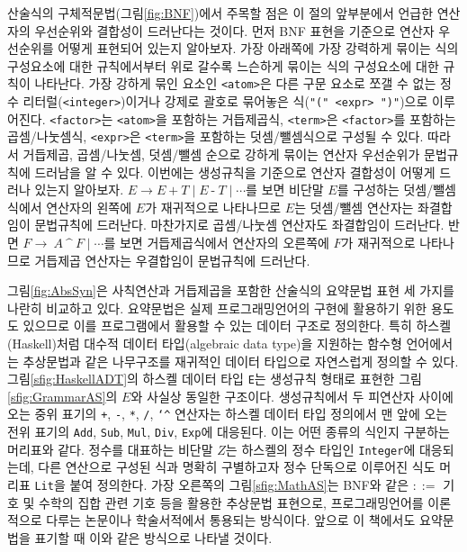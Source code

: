\documentclass[b5paper,chapter,figtabcapt]{oblivoir}
\begin{document}
산술식의 구체적문법(그림\;\ref{fig:BNF})에서 주목할 점은 이 절의
앞부분에서 언급한 연산자의 우선순위와 결합성이 드러난다는 것이다.
먼저 BNF 표현을 기준으로 연산자 우선순위를 어떻게 표현되어 있는지 알아보자.
가장 아래쪽에 가장 강력하게 묶이는 식의 구성요소에 대한 규칙에서부터
위로 갈수록 느슨하게 묶이는 식의 구성요소에 대한 규칙이 나타난다.
가장 강하게 묶인 요소인 \texttt{<atom>}은
다른 구문 요소로 쪼갤 수 없는 정수 리터럴(\texttt{<integer>})이거나
강제로 괄호로 묶어놓은 식(\texttt{"(" <expr> ")"})으로 이루어진다.
\texttt{<factor>}는 \texttt{<atom>}을 포함하는 거듭제곱식,
\texttt{<term>}은 \texttt{<factor>}를 포함하는 곱셈/나눗셈식,
\texttt{<expr>}은 \texttt{<term>}을 포함하는 덧셈/뺄셈식으로
구성될 수 있다. 따라서 거듭제곱, 곱셈/나눗셈, 덧셈/뺄셈 순으로
강하게 묶이는 연산자 우선순위가 문법규칙에 드러남을 알 수 있다.
이번에는 생성규칙을 기준으로 연산자 결합성이 어떻게 드러나 있는지 알아보자.
$E \to E ~\texttt{+}~ T \mid  E ~\texttt{-}~ T \mid \cdots$를 보면
비단말 $E$를 구성하는 덧셈/뺄셈식에서 연산자의 왼쪽에 $E$가 재귀적으로
나타나므로 $E$는 덧셈/뺄셈 연산자는 좌결합임이 문법규칙에 드러난다.
마찬가지로 곱셈/나눗셈 연산자도 좌결합임이 드러난다.
반면 $F \to~ A ~\texttt{\char`^}~ F \mid \cdots$를 보면 거듭제곱식에서
연산자의 오른쪽에 $F$가 재귀적으로 나타나므로 거듭제곱 연산자는
우결합임이 문법규칙에 드러난다.

그림\;\ref{fig:AbsSyn}은 사칙연산과 거듭제곱을 포함한 산술식의
요약문법 표현 세 가지를 나란히 비교하고 있다. 요약문법은 실제
프로그래밍언어의 구현에 활용하기 위한 용도도 있으므로 이를
프로그램에서 활용할 수 있는 데이터 구조로 정의한다. 특히
하스켈(Haskell)처럼 대수적 데이터 타입(algebraic data type)을
지원하는 함수형 언어에서는 추상문법과 같은 나무구조를 재귀적인
데이터 타입으로 자연스럽게 정의할 수 있다.
그림\;\ref{sfig:HaskellADT}의 하스켈 데이터 타입 \texttt{E}는
생성규칙 형태로 표현한 그림\;\ref{sfig:GrammarAS}의 $E$와
사실상 동일한 구조이다. 생성규칙에서 두 피연산자 사이에 오는
중위 표기의 \texttt{+}, \texttt{-}, \texttt{*}, \texttt{/},
\texttt{\char`^} 연산자는 하스켈 데이터 타입 정의에서
맨 앞에 오는 전위 표기의 \texttt{Add}, \texttt{Sub}, \texttt{Mul},
\texttt{Div}, \texttt{Exp}에 대응된다. 이는 어떤 종류의 식인지
구분하는 머리표와 같다. 정수를 대표하는 비단말 $Z$는 하스켈의
정수 타입인 \texttt{Integer}에 대응되는데, 다른 연산으로 구성된 식과
명확히 구별하고자 정수 단독으로 이루어진 식도 머리표 \texttt{Lit}을
붙여 정의한다. 가장 오른쪽의 그림\;\ref{sfig:MathAS}는 BNF와 같은
$::=$ 기호 및 수학의 집합 관련 기호 등을 활용한 추상문법 표현으로,
프로그래밍언어를 이론적으로 다루는 논문\cite{Milner78,tal-toplas99}이나
학술서적\cite{Winskel93,Mitchell96fpl}에서 통용되는 방식이다. 앞으로
이 책에서도 요약문법을 표기할 때 이와 같은 방식으로 나타낼 것이다.
\end{document}
